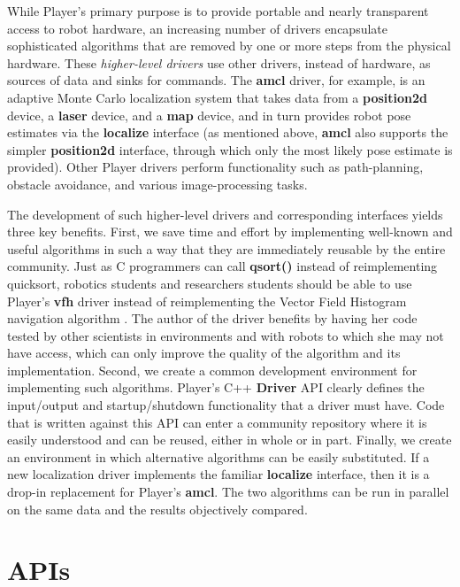 While Player's primary purpose is to provide portable and nearly
transparent access to robot hardware, an increasing number of drivers
encapsulate sophisticated algorithms that are removed by one or more
steps from the physical hardware.  These {\em higher-level drivers}
use other drivers, instead of hardware, as sources of data and sinks
for commands.  The {\bf amcl} driver, for example, is an adaptive
Monte Carlo localization system \cite{32_ThrunFox03} that takes data
from a {\bf position2d} device, a {\bf laser} device, and a {\bf map}
device, and in turn provides robot pose estimates via the {\bf
localize} interface (as mentioned above, {\bf amcl} also supports the
simpler {\bf position2d} interface, through which only the most likely
pose estimate is provided).  Other Player drivers perform
functionality such as path-planning, obstacle avoidance, and various
image-processing tasks.

The development of such higher-level drivers and corresponding interfaces
yields three key benefits.  First, we save time and effort by implementing
well-known and useful algorithms in such a way that they are immediately
reusable by the entire community.  Just as C programmers can call
{\bf qsort()} instead of reimplementing quicksort, robotics students
and researchers students should be able to use Player's {\bf vfh}
driver instead of reimplementing the Vector Field Histogram navigation
algorithm \cite{32_vfh}.  The author of the driver benefits by having
her code tested by other scientists in environments and with robots to
which she may not have access, which can only improve the quality of the
algorithm and its implementation.  Second, we create a common development
environment for implementing such algorithms.  Player's C++ {\bf Driver}
API clearly defines the input/output and startup/shutdown functionality
that a driver must have.  Code that is written against this API can enter
a community repository where it is easily understood and can be reused,
either in whole or in part.  Finally, we create an environment in which
alternative algorithms can be easily substituted.  If a new localization
driver implements the familiar {\bf localize} interface, then it is a
drop-in replacement for Player's {\bf amcl}.  The two algorithms can be
run in parallel on the same data and the results objectively compared.

\section{APIs}

